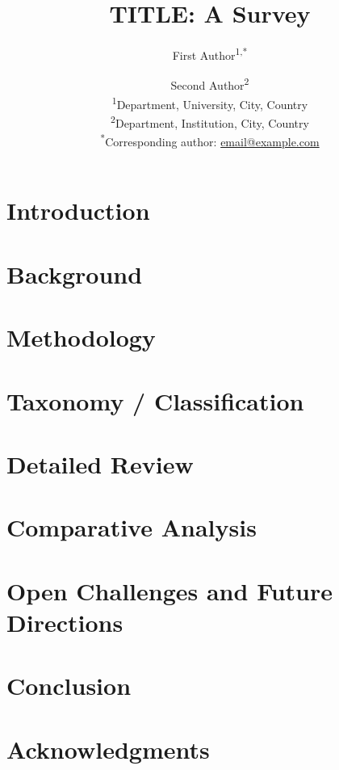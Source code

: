 \documentclass[12pt,a4paper]{article}
\title{TITLE: A Survey}
\author{
    First Author\textsuperscript{1,*} \and
    Second Author\textsuperscript{2}
    \\[1em]
    \small\textsuperscript{1}Department, University, City, Country \\
    \small\textsuperscript{2}Department, Institution, City, Country \\
    \small\textsuperscript{*}Corresponding author: \href{mailto:email@example.com}{email@example.com}
}
\date{}
\begin{document}
\maketitle

\begin{abstract}
\end{abstract}

\tableofcontents
\newpage

\section{Introduction}

\section{Background}

\section{Methodology}

\section{Taxonomy / Classification}

\section{Detailed Review}

\section{Comparative Analysis}

\section{Open Challenges and Future Directions}

\section{Conclusion}

\section*{Acknowledgments}



\end{document}
